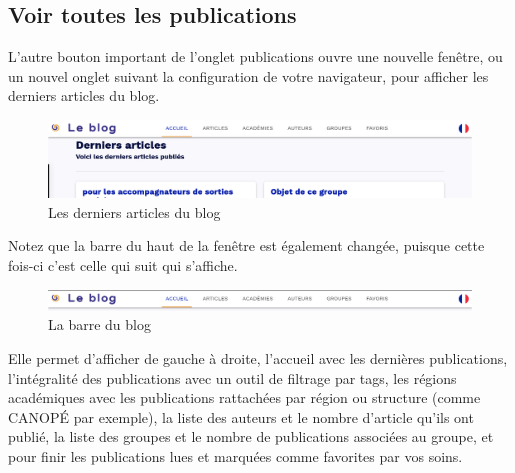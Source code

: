 \subsection{Voir toutes les publications}
L'autre bouton important de l'onglet publications ouvre une nouvelle fenêtre, ou un nouvel onglet suivant la configuration de votre navigateur, pour afficher les derniers articles du blog.
\begin{figure}
	\centering
	\includegraphics{./Captures/portail.publications.afficher.toutes.le.blog.png}
	\caption{Les derniers articles du blog}
\end{figure}

Notez que la barre du haut de la fenêtre est également changée, puisque cette fois-ci c'est celle qui suit qui s'affiche.
\begin{figure}
	\centering
	\includegraphics{./Captures/portail.publications.afficher.toutes.le.blog.barre.png}
	\caption{La barre du blog}
\end{figure}
Elle permet d'afficher de gauche à droite, l'accueil avec les dernières publications, l'intégralité des publications avec un outil de filtrage par tags, les régions académiques avec les publications rattachées par région ou structure (comme CANOPÉ par exemple), la liste des auteurs et le nombre d'article qu'ils ont publié, la liste des groupes et le nombre de publications associées au groupe, et pour finir les publications lues et marquées comme favorites par vos soins.